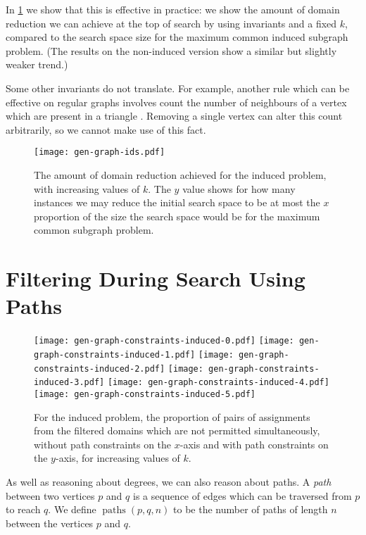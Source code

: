 \documentclass[letterpaper]{article}
\theoremstyle{definition}
\newcommand{\paths}{\operatorname{paths}}
\begin{document}
In \cref{figure:ids} we show that this is effective in practice: we show the amount of domain reduction
we can achieve at the top of search by using invariants and a fixed $k$, compared to the search
space size for the maximum common induced subgraph problem. (The results on the non-induced version
show a similar but slightly weaker trend.)

Some other invariants do not translate. For example, another rule which can be effective on regular
graphs involves count the number of neighbours of a vertex which are present in a triangle
\cite{mckay2014practical}. Removing a single vertex can alter this count arbitrarily, so we cannot
make use of this fact.

\begin{figure}
    \centering
    \texttt{[image: gen-graph-ids.pdf]}
    \caption{The amount of domain reduction achieved for the induced problem, with increasing values
    of $k$. The $y$ value shows for how many instances we may reduce the initial search space to be
    at most the $x$ proportion of the size the search space would be for the maximum common subgraph
    problem.}\label{figure:ids}
\end{figure}

\section{Filtering During Search Using Paths}\label{section:pathfiltering}

\begin{figure*}[tb]
    \centering
    \texttt{[image: gen-graph-constraints-induced-0.pdf]}
    \texttt{[image: gen-graph-constraints-induced-1.pdf]}
    \texttt{[image: gen-graph-constraints-induced-2.pdf]}
    \texttt{[image: gen-graph-constraints-induced-3.pdf]}
    \texttt{[image: gen-graph-constraints-induced-4.pdf]}
    \texttt{[image: gen-graph-constraints-induced-5.pdf]}

    \caption{For the induced problem, the proportion of pairs of assignments from the filtered
    domains which are not permitted simultaneously, without path constraints on the $x$-axis and
    with path constraints on the $y$-axis, for increasing values of $k$.}\label{figure:constraints}
\end{figure*}

As well as reasoning about degrees, we can also reason about paths.  A \emph{path} between two
vertices $p$ and $q$ is a sequence of edges which can be traversed from $p$ to reach $q$. We define
$\paths(p,q,n)$ to be the number of paths of length $n$ between the vertices $p$ and $q$.
\end{document}

